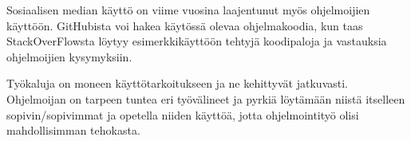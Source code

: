 \documentclass[finnish]{tktltiki2}
\theoremstyle{definition}
\theoremstyle{remark}
\begin{document}
Sosiaalisen median käyttö on viime vuosina laajentunut myös ohjelmoijien käyttöön. GitHubista voi hakea käytössä olevaa ohjelmakoodia, kun taas StackOverFlowsta löytyy esimerkkikäyttöön tehtyjä koodipaloja ja vastauksia ohjelmoijien kysymyksiin.

Työkaluja on moneen käyttötarkoitukseen ja ne kehittyvät jatkuvasti. Ohjelmoijan on tarpeen tuntea eri työvälineet ja pyrkiä löytämään niistä itselleen sopivin/sopivimmat ja opetella niiden käyttöä, jotta ohjelmointityö olisi mahdollisimman tehokasta.

\newpage


\end{document}
